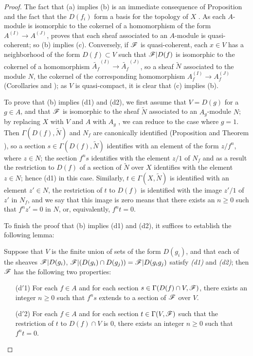 \begin{proof}
\label{proof-1.1.4.1}
The fact that (a) implies (b) is an immediate consequence of Proposition  and the fact
that the $D(f_i)$ form a basis for the topology of $X$ . As each
$A$-module is isomorphic to the cokernel of a homomorphism of the form $A^{(I)}\to A^{(J)}$,
 proves that each sheaf associated to an $A$-module is quasi-coherent; so
(b) implies (c). Conversely, if $\mathscr{F}$ is quasi-coherent, each $x\in V$ has a neighborhood
of the form $D(f)\subset V$ such that $\mathscr{F}|D(f)$ is isomorphic to the cokernel of a
homomorphism $\widetilde{A_f}^{(I)}\to\widetilde{A_f}^{(J)}$, so a sheaf $\widetilde{N}$
associated to the module $N$, the cokernel of the corresponding homomorphism
$A_f^{(I)}\to A_f^{(J)}$ (Corollaries  and ); as $V$ is quasi-compact,
it is clear that (c) implies (b).

To prove that (b) implies (d1) and (d2), we first assume that $V=D(g)$ for a $g\in A$, and
that $\mathscr{F}$ is isomorphic to the sheaf $\widetilde{N}$ associated to an $A_g$-module $N$;
by replacing $X$ with $V$ and $A$ with $A_g$ , we can reduce to the case
where $g=1$. Then $\Gamma(D(f),\widetilde{N})$ and $N_f$ are canonically identified
(Proposition  and Theorem ), so a section $s\in\Gamma(D(f),\widetilde{N})$
identifies with an element of the form $z/f^n$, where $z\in N$; the section $f^n s$ identifies
with the element $z/1$ of $N_f$ and as a result the restriction to $D(f)$ of a section of
$\widetilde{N}$ over $X$ identifies with the element $z\in N$; hence (d1) in this case.
Similarly, $t\in\Gamma(X,\widetilde{N})$ is identified with an element $z'\in N$, the
restriction of $t$ to $D(f)$ is identified with the image $z'/1$ of $z'$ in $N_f$, and we say
that this image is zero means that there exists an $n\geqslant 0$ such that $f^n z'=0$ in
$N$, or, equivalently, $f^n t=0$.

To finish the proof that (b) implies (d1) and (d2), it suffices to establish the following
lemma:
\begin{lem}[1.4.1.1]
\label{1.1.4.1.1}
Suppose that $V$ is the finite union of sets of the form $D(g_i)$, and that each of the
sheaves $\mathscr{F}|D(g_i)$, $\mathscr{F}|(D(g_i)\cap D(g_j))=\mathscr{F}|D(g_i g_j)$ satisfy {\em (d1)}
and {\em (d2)}; then $\mathscr{F}$ has the following two properties:
\begin{itemize}
  \item[{\rm(d$'$1)}] For each $f\in A$ and for each section $s\in\Gamma(D(f)\cap V,\mathscr{F})$, there exists
    an integer $n\geqslant 0$ such that $f^n s$ extends to a section of $\mathscr{F}$ over $V$.
  \item[{\rm(d$'$2)}] For each $f\in A$ and for each section $t\in\Gamma(V,\mathscr{F})$ such that the
    restriction of $t$ to $D(f)\cap V$ is $0$, there exists an integer $n\geqslant 0$ such that $f^n t=0$.
\end{itemize}
\end{lem}


\end{proof}
